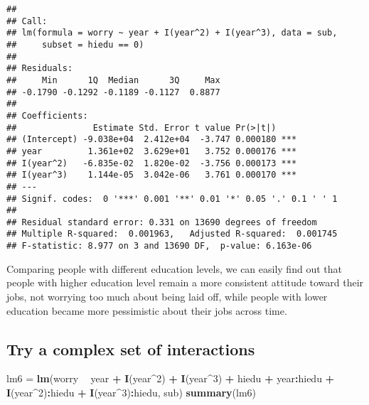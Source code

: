 \documentclass[]{article}
\newenvironment{Shaded}{\begin{snugshade}}{\end{snugshade}}
\newcommand{\DecValTok}[1]{\textcolor[rgb]{0.00,0.00,0.81}{#1}}
\newcommand{\KeywordTok}[1]{\textcolor[rgb]{0.13,0.29,0.53}{\textbf{#1}}}
\newcommand{\NormalTok}[1]{#1}
\newcommand{\OperatorTok}[1]{\textcolor[rgb]{0.81,0.36,0.00}{\textbf{#1}}}
\newcommand{\StringTok}[1]{\textcolor[rgb]{0.31,0.60,0.02}{#1}}
\begin{document}
\begin{verbatim}
## 
## Call:
## lm(formula = worry ~ year + I(year^2) + I(year^3), data = sub, 
##     subset = hiedu == 0)
## 
## Residuals:
##     Min      1Q  Median      3Q     Max 
## -0.1790 -0.1292 -0.1189 -0.1127  0.8877 
## 
## Coefficients:
##               Estimate Std. Error t value Pr(>|t|)    
## (Intercept) -9.038e+04  2.412e+04  -3.747 0.000180 ***
## year         1.361e+02  3.629e+01   3.752 0.000176 ***
## I(year^2)   -6.835e-02  1.820e-02  -3.756 0.000173 ***
## I(year^3)    1.144e-05  3.042e-06   3.761 0.000170 ***
## ---
## Signif. codes:  0 '***' 0.001 '**' 0.01 '*' 0.05 '.' 0.1 ' ' 1
## 
## Residual standard error: 0.331 on 13690 degrees of freedom
## Multiple R-squared:  0.001963,   Adjusted R-squared:  0.001745 
## F-statistic: 8.977 on 3 and 13690 DF,  p-value: 6.163e-06
\end{verbatim}

Comparing people with different education levels, we can easily find out
that people with higher education level remain a more consistent
attitude toward their jobs, not worrying too much about being laid off,
while people with lower education became more pessimistic about their
jobs across time.

\hypertarget{try-a-complex-set-of-interactions}{%
\subsection{Try a complex set of
interactions}\label{try-a-complex-set-of-interactions}}

\begin{Shaded}
\begin{Highlighting}[]
\NormalTok{lm6 =}\StringTok{ }\KeywordTok{lm}\NormalTok{(worry }\OperatorTok{~}\StringTok{ }\NormalTok{year }\OperatorTok{+}\StringTok{ }\KeywordTok{I}\NormalTok{(year}\OperatorTok{^}\DecValTok{2}\NormalTok{) }\OperatorTok{+}\StringTok{ }\KeywordTok{I}\NormalTok{(year}\OperatorTok{^}\DecValTok{3}\NormalTok{) }\OperatorTok{+}\StringTok{ }\NormalTok{hiedu }\OperatorTok{+}\StringTok{ }\NormalTok{year}\OperatorTok{:}\NormalTok{hiedu }\OperatorTok{+}\StringTok{ }\KeywordTok{I}\NormalTok{(year}\OperatorTok{^}\DecValTok{2}\NormalTok{)}\OperatorTok{:}\NormalTok{hiedu }\OperatorTok{+}\StringTok{ }\KeywordTok{I}\NormalTok{(year}\OperatorTok{^}\DecValTok{3}\NormalTok{)}\OperatorTok{:}\NormalTok{hiedu, sub)}
\KeywordTok{summary}\NormalTok{(lm6)}
\end{Highlighting}
\end{Shaded}
\end{document}
